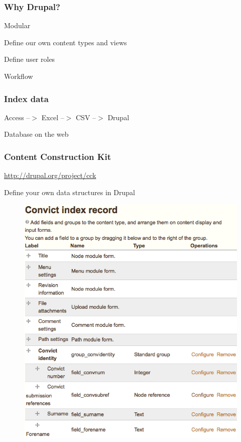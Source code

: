 \documentclass[ignorenonframetext,11pt]{beamer}
\begin{document}
\begin{frame}
\frametitle{Why Drupal?}
\label{whydrupal}

Modular


Define our own content types and views


Define user roles


Workflow



\end{frame}
		

\begin{frame}
\frametitle{Index data}
\label{indexdata}

Access --$>$ Excel --$>$ CSV --$>$ Drupal


Database on the web



\end{frame}
		

\begin{frame}
\frametitle{Content Construction Kit}
\label{contentconstructionkit}

\url{http://drupal.org/project/cck}


Define your own data structures in Drupal


\begin{figure}
	\label{convindex}
	\begin{center}
	\includegraphics[keepaspectratio,width=\textwidth, height=.75\textheight]{images/convindex.png}
	\end{center}
	\end{figure}
	



\end{frame}
		
\end{document}

